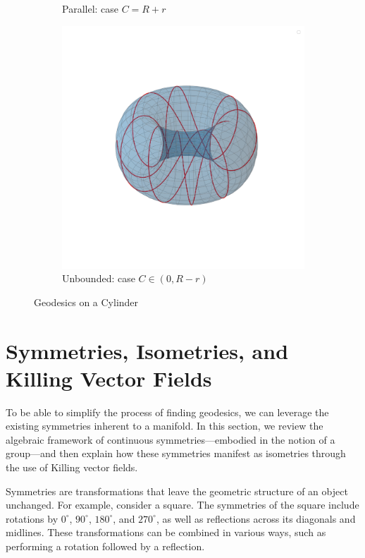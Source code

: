 \documentclass[12pt]{article}
\begin{document}
\begin{figure}[ht]
\begin{subfigure}[b]{0.4\linewidth}
	  \caption{Parallel: case $C=R+r$}
	  \label{subfig:helix}
	\end{subfigure}
	\hfill
	\begin{subfigure}[b]{0.4\linewidth}
	  \centering
	  \includegraphics[width=1.0\textwidth]{images/torus_ub1.png}
	  \caption{Unbounded: case $C \in (0, R-r)$}
	  \label{subfig:circle}
	\end{subfigure}
	\caption{Geodesics on a Cylinder}
	\label{fig:geodesics-on-cylinder}
\end{figure}

\section{Symmetries, Isometries, and Killing Vector Fields}

To be able to simplify the process of finding geodesics, we can leverage the existing symmetries inherent to a manifold.
In this section, we review the algebraic framework of continuous symmetries—embodied in the notion of a group—and then explain how these symmetries manifest as isometries through the use of Killing vector fields. 

Symmetries are transformations that leave the geometric structure of an object unchanged.
For example, consider a square. The symmetries of the square include rotations by \(0^\circ\), \(90^\circ\), \(180^\circ\), and \(270^\circ\), as well as reflections across its diagonals and midlines.
These transformations can be combined in various ways, such as performing a rotation followed by a reflection.
\end{document}
